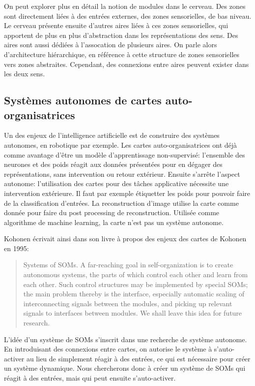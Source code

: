 \documentclass[../main]{subfiles}
\begin{document}
On peut explorer plus en détail la notion de modules dans le cerveau. Des zones sont directement liées à des entrées externes, des zones sensorielles, de bas niveau. Le cerveau présente ensuite  d'autres aires liées à ces zones sensorielles, qui apportent de plus en plus d'abstraction dans les représentations des sens. Des aires sont aussi dédiées à l'assocation de plusieurs aires. On parle alors d'architecture hiérarchique, en référence à cette structure de zones sensorielles vers zones abstraites. Cependant, des connexions entre aires peuvent exister dans les deux sens. 


\subsection{Systèmes autonomes de cartes auto-organisatrices}

Un des enjeux de l'intelligence artificielle est de construire des systèmes autonomes, en robotique par exemple. Les cartes auto-organisatrices ont déjà comme avantage d'être un modèle d'apprentissage non-supervisé: l'ensemble des neurones et des poids réagit aux données présentées pour en dégager des représentations, sans intervention ou retour extérieur. Ensuite s'arrête l'aspect autonome: l'utilisation des cartes pour des tâches applicative nécessite une intervention extérieure. Il faut par exemple étiquetter les poids pour pouvoir faire de la classification d'entrées. La reconstruction d'image utilise la carte comme donnée pour faire du post processing de reconstruction. Utilisée comme algorithme de machine learning, la carte n'est pas un système autonome. 

Kohonen écrivait ainsi dans son livre à propos des enjeux des cartes de Kohonen en 1995:


\begin{quote}Systems of SOMs. A far-reaching goal in self-organization is to create
autonomous systems, the parts of which control each other and learn from
each other. Such control structures may be implemented by special SOMs;
the main problem thereby is the interface, especially automatic scaling of
interconnecting signals between the modules, and picking up relevant signals
to interfaces between modules. We shall leave this idea for future research. \cite{Kohonen1995SelfOrganizingM}
\end{quote}
L'idée d'un système de SOMs s'inscrit dans une recherche de système autonome. En introduisant des connexions entre cartes, on autorise le système à s'auto-activer au lieu de simplement réagir à des entrées, ce qui est nécessaire pour créer un système dynamique. Nous chercherons donc à créer un système de SOMs qui réagit à des entrées, mais qui peut ensuite s'auto-activer.
\end{document}
